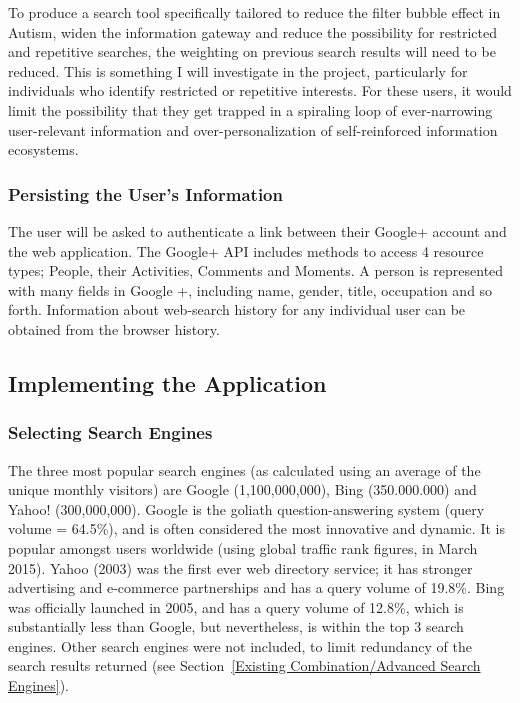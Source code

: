 \documentclass[a4paper, 10pt]{article}
\begin{document}
To produce a search tool specifically tailored to reduce the filter bubble effect in Autism, widen the information gateway and reduce the possibility for restricted and repetitive searches, the weighting on previous search results will need to be reduced. This is something I will investigate in the project, particularly for individuals who identify restricted or repetitive interests. For these users, it would limit the possibility that they get trapped in a spiraling loop of ever-narrowing user-relevant information and over-personalization of self-reinforced information ecosystems.

\subsubsection{Persisting the User's Information}
The user will be asked to authenticate a link between their Google+ account and the web application. The Google+ API includes methods to access 4 resource  types; People, their Activities, Comments and Moments. A person is represented with many fields in Google +, including name, gender, title, occupation and so forth. Information about web-search history for any individual user can be obtained from the browser history. 

\subsection{Implementing the Application}\label{api}
\subsubsection{Selecting Search Engines} 
The three most popular search engines (as calculated using an average of the unique monthly visitors) are Google (1,100,000,000), Bing (350.000.000) and Yahoo! (300,000,000)\cite{ebiz}. Google is the goliath question-answering system (query volume = 64.5\%)\cite{adam}, and is often considered the most innovative and dynamic. It is popular amongst users worldwide (using global traffic rank figures, in March 2015). Yahoo (2003) was the first ever web directory service; it has stronger advertising and e-commerce partnerships and has a query volume of 19.8\%. Bing was officially launched in 2005, and has a query volume of 12.8\%, which is substantially less than Google, but nevertheless, is within the top 3 search engines. Other search engines were not included, to limit redundancy of the search results returned (see Section~\ref{Existing Combination/Advanced Search Engines}). 
\end{document}

